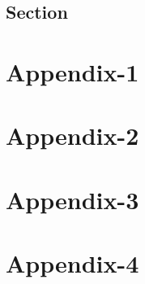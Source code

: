 \documentclass[
]{report}
\begin{document}
\label{chapter-4}

\hypertarget{section-4.1}{%
\section{Section}\label{section-4.1}}

\chapter[Appendix-1]{Appendix-1}\label{appendix-1}

\chapter[Appendix-2]{Appendix-2}\label{appendix-2}

\chapter[Appendix-3]{Appendix-3}\label{appendix-3}

\chapter[Appendix-4]{Appendix-4}\label{appendix-4}
\end{document}
